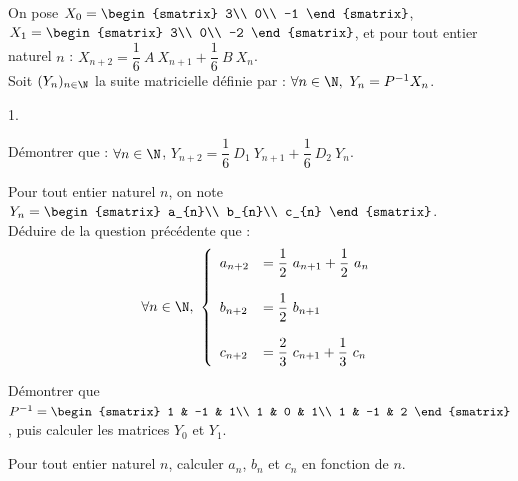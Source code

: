 \noindent
On pose $X_{0} =
\begin{smatrix}
  3\\
  0\\
  -1
\end{smatrix}
$, $X_{1} = 
\begin{smatrix}
  3\\
  0\\
  -2
\end{smatrix}
$, et pour tout entier naturel $n$ : $X_{n + 2} = \dfrac{1}{6} \ A \
X_{n + 1} + \dfrac{1}{6} \ B \ X_{n}$. \\
Soit $(Y_{n})_{n \in \N}$ la suite matricielle définie par : $\forall
n \in \N, \ Y_{n} = P^{-1} X_{n}$.
\begin{noliste}{1.}
  \setlength{\itemsep}{4mm}
\item Démontrer que : $\forall n \in \N $, $Y_{n + 2} = \dfrac{1}{6} \
  D_{1} \ Y_{n + 1} + \dfrac{1}{6} \ D_{2} \ Y_{n}$.

  

\item Pour tout entier naturel $n$, on note $Y_{n} =
  \begin{smatrix}
    a_{n}\\
    b_{n}\\
    c_{n}
  \end{smatrix}
  $.\\
  Déduire de la question précédente que :
  \[
  \forall n \in \N, \ \left\{
    \begin{array}{ll}
      a_{n + 2} & = \dfrac{1}{2} \ a_{n + 1} + \dfrac{1}{2} \ a_{n}\\
      & \\
      b_{n + 2} & = \dfrac{1}{2} \ b_{n + 1}\\
      & \\
      c_{n + 2} & = \dfrac{2}{3} \ c_{n + 1} + \dfrac{1}{3} \ c_{n}
    \end{array}
  \right.
  \]

\newpage  

\item Démontrer que $P^{-1} =
  \begin{smatrix}
    1 & -1 & 1\\
    1 & 0 & 1\\
    1 & -1 & 2
  \end{smatrix}
  $, puis calculer les matrices $Y_{0}$ et $Y_{1}$.

  

\item Pour tout entier naturel $n$, calculer $a_{n}$, $b_{n}$ et
  $c_{n}$ en fonction de $n$.


\end{noliste}
